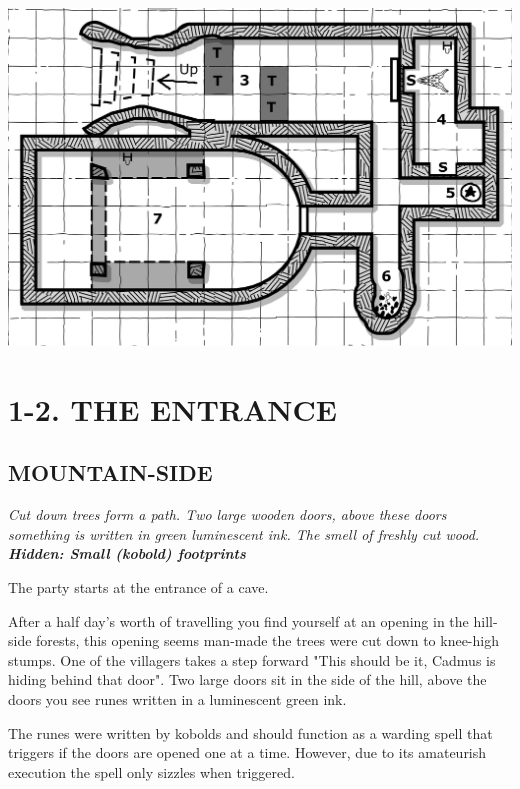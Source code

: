 \documentclass[letterpaper,sansserif,tightsqueeze]{rpg-module}
\begin{document}
\vspace{0.2cm}

\includegraphics[width=\linewidth]{map_secret_2.png}

\section{1-2. THE ENTRANCE}

\setcounter{subsection}{0}

\subsection{MOUNTAIN-SIDE}
\textit{Cut down trees form a path. Two large wooden doors, above these doors something is written in green luminescent ink. The smell of freshly cut wood. \textbf{Hidden: Small (kobold) footprints}}

The party starts at the entrance of a cave.

\begin{boxtext}
	After a half day's worth of travelling you find yourself at an opening in the hill-side forests, this opening seems man-made the trees were cut down to knee-high stumps. One of the villagers takes a step forward "This should be it, Cadmus is hiding behind that door". Two large doors sit in the side of the hill, above the doors you see runes written in a luminescent green ink.
\end{boxtext}

The runes were written by kobolds and should function as a warding spell that triggers if the doors are opened one at a time. However, due to its amateurish execution the spell only sizzles when triggered. 
\end{document}
